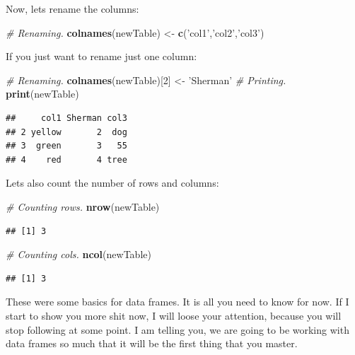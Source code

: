 \documentclass[]{book}
\newenvironment{Shaded}{\begin{snugshade}}{\end{snugshade}}
\newcommand{\CommentTok}[1]{\textcolor[rgb]{0.56,0.35,0.01}{\textit{#1}}}
\newcommand{\DecValTok}[1]{\textcolor[rgb]{0.00,0.00,0.81}{#1}}
\newcommand{\KeywordTok}[1]{\textcolor[rgb]{0.13,0.29,0.53}{\textbf{#1}}}
\newcommand{\NormalTok}[1]{#1}
\newcommand{\StringTok}[1]{\textcolor[rgb]{0.31,0.60,0.02}{#1}}
\begin{document}
Now, lets rename the columns:

\begin{Shaded}
\begin{Highlighting}[]
\CommentTok{# Renaming.}
\KeywordTok{colnames}\NormalTok{(newTable) <-}\StringTok{ }\KeywordTok{c}\NormalTok{(}\StringTok{'col1'}\NormalTok{,}\StringTok{'col2'}\NormalTok{,}\StringTok{'col3'}\NormalTok{)}
\end{Highlighting}
\end{Shaded}

If you just want to rename just one column:

\begin{Shaded}
\begin{Highlighting}[]
\CommentTok{# Renaming.}
\KeywordTok{colnames}\NormalTok{(newTable)[}\DecValTok{2}\NormalTok{] <-}\StringTok{ 'Sherman'}
\CommentTok{# Printing.}
\KeywordTok{print}\NormalTok{(newTable)}
\end{Highlighting}
\end{Shaded}

\begin{verbatim}
##     col1 Sherman col3
## 2 yellow       2  dog
## 3  green       3   55
## 4    red       4 tree
\end{verbatim}

Lets also count the number of rows and columns:

\begin{Shaded}
\begin{Highlighting}[]
\CommentTok{# Counting rows.}
\KeywordTok{nrow}\NormalTok{(newTable)}
\end{Highlighting}
\end{Shaded}

\begin{verbatim}
## [1] 3
\end{verbatim}

\begin{Shaded}
\begin{Highlighting}[]
\CommentTok{# Counting cols.}
\KeywordTok{ncol}\NormalTok{(newTable)}
\end{Highlighting}
\end{Shaded}

\begin{verbatim}
## [1] 3
\end{verbatim}

These were some basics for data frames. It is all you need to know for now. If I start to show you more shit now, I will loose your attention, because you will stop following at some point. I am telling you, we are going to be working with data frames so much that it will be the first thing that you master.
\end{document}
